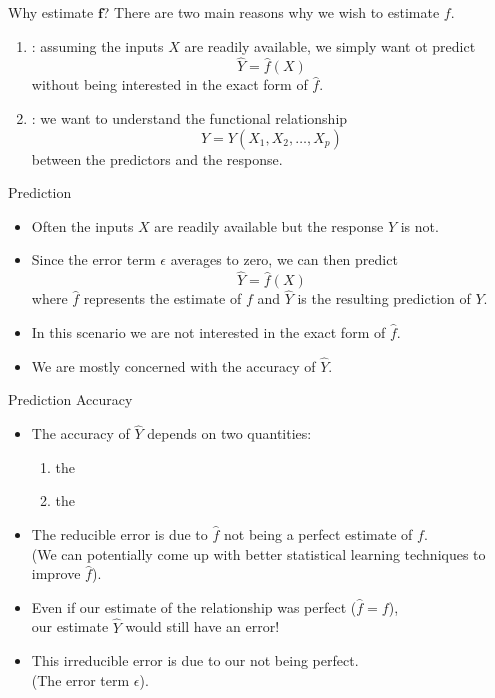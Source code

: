 \documentclass[mathserif, aspectratio=169]{beamer}
\begin{document}
\begin{frame}{Why estimate $\bm{f}$?}
		There are two main reasons why we wish to estimate $f$.
	\begin{enumerate}
		\item {}: assuming the inputs $X$ are readily available, we simply want ot
			predict
			\[\hat{Y} = \hat{f}(X)\]
			without being interested in the exact form of $\hat{f}$.
		\item {}: we want to understand the functional relationship
			\[Y = Y(X_1, X_2, \dots, X_p)\]
			between the predictors and the response.
	\end{enumerate}
\end{frame}

\begin{frame}{Prediction}
	\begin{itemize}
		\item Often the inputs $X$ are readily available but the response $Y$ is not.
		\item Since the error term $\epsilon$ averages to zero, we can then predict
			\[\hat{Y} = \hat{f}(X)\]
			where $\hat{f}$ represents the estimate of $f$ and $\hat{Y}$ is the resulting
			prediction of $Y$.
		\item In this scenario we are not interested in the exact form of $\hat{f}$.
		\item We are mostly concerned with the accuracy of $\hat{Y}$.
	\end{itemize}
\end{frame}

\begin{frame}{Prediction Accuracy}
	\begin{itemize}
		\item The accuracy of $\hat{Y}$ depends on two quantities:
			\begin{enumerate}
				\item the 
				\item the 
			\end{enumerate}
		\item The reducible error is due to $\hat{f}$ not being a perfect estimate of $f$.\\
			(We can potentially come up with better statistical learning techniques to 
			improve $\hat{f}$).
		\item Even if our estimate of the relationship was perfect ($\hat{f} = f$),\\
			our estimate $\hat{Y}$ would still have an error!
		\item This irreducible error is due to our  not being perfect.\\
			(The error term $\epsilon$).
	\end{itemize}
\end{frame}
\end{document}
